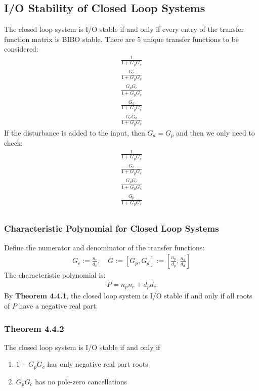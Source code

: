 \documentclass[letterpaper,12pt]{article}
\begin{document}
\subsection{I/O Stability of Closed Loop Systems}
The closed loop system is I/O stable if and only if every entry of the transfer function matrix is BIBO stable. There are 
5 unique transfer functions to be considered:
\begin{align*}
    \frac{1}{1+G_p G_c} \\
    \frac{G_c}{1+G_p G_c} \\
    \frac{G_p G_c}{1+G_p G_c} \\
    \frac{G_d}{1+G_p G_c} \\
    \frac{G_c G_d}{1+G_p G_c} 
\end{align*}
If the disturbance is added to the input, then $G_d = G_p$ and then we only need to check:
\begin{align*}
    \frac{1}{1+G_p G_c} \\
    \frac{G_c}{1+G_p G_c} \\
    \frac{G_p G_c}{1+G_p G_c} \\
    \frac{G_p}{1+G_p G_c} \\
\end{align*}
\subsubsection{Characteristic Polynomial for Closed Loop Systems}
Define the numerator and denominator of the transfer functions:
\begin{align*}
    G_c := \frac{n_c}{d_c}, \quad G := [G_p, G_d] := [\frac{n_p}{d_p}, \frac{n_d}{d_d}]
\end{align*}
The characteristic polynomial is:
\begin{align*}
    P = n_p n_c + d_p d_c
\end{align*}
By \textbf{Theorem 4.4.1}, the closed loop system is I/O stable if and only if all roots of $P$ have a negative real part.

\subsubsection{Theorem 4.4.2}
The closed loop system is I/O stable if and only if
\begin{enumerate}
    \item $1 + G_p G_c$ has only negative real part roots
    \item $G_p G_c$ has no pole-zero cancellations
\end{enumerate}
\end{document}
